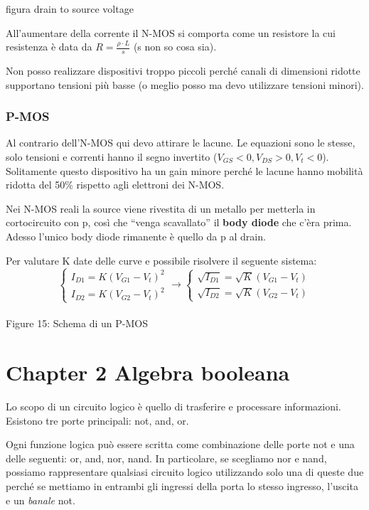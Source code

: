 \documentclass[
]{article}
\begin{document}
figura drain to source voltage

All'aumentare della corrente il N-MOS si comporta come un resistore la
cui resistenza è data da \(R=\frac{\rho\cdot L}{s}\) (s non so cosa
sia).

Non posso realizzare dispositivi troppo piccoli perché canali di
dimensioni ridotte supportano tensioni più basse (o meglio posso ma devo
utilizzare tensioni minori).

\subsubsection{P-MOS}\label{p-mos}

Al contrario dell'N-MOS qui devo attirare le lacune. Le equazioni sono
le stesse, solo tensioni e correnti hanno il segno invertito
(\(V_{GS}<0,V_{DS}>0,V_{t}<0\)). Solitamente questo dispositivo ha un
gain minore perché le lacune hanno mobilità ridotta del 50\% rispetto
agli elettroni dei N-MOS.

Nei N-MOS reali la source viene rivestita di un metallo per metterla in
cortocircuito con p, così che ``venga scavallato'' il \textbf{body
diode} che c'èra prima. Adesso l'unico body diode rimanente è quello da
p al drain.

Per valutare K date delle curve e possibile risolvere il seguente
sistema: \[
\begin{cases}
I_{D1}=K(V_{G1}-V_{t})^{2}\\
I_{D2}=K(V_{G2}-V_{t})^{2}\end{cases}\longrightarrow\begin{cases}\sqrt{I_{D1}}=\sqrt{K}(V_{G1}-V_{t})\\
\sqrt{I_{D2}}=\sqrt{K}(V_{G2}-V_{t})
\end{cases}
\]\\
Figure 15: Schema di un P-MOS

\newpage

\section{Chapter 2 Algebra booleana}\label{chapter-2-algebra-booleana}

Lo scopo di un circuito logico è quello di trasferire e processare
informazioni. Esistono tre porte principali: not, and, or.

Ogni funzione logica può essere scritta come combinazione delle porte
not e una delle seguenti: or, and, nor, nand. In particolare, se
scegliamo nor e nand, possiamo rappresentare qualsiasi circuito logico
utilizzando solo una di queste due perché se mettiamo in entrambi gli
ingressi della porta lo stesso ingresso, l'uscita e un \emph{banale}
not.
\end{document}
